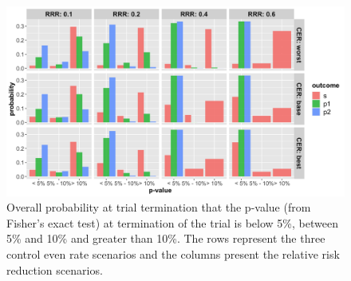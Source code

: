 \documentclass[]{article}
\begin{document}
\begin{figure}
  \caption{Overall probability at trial termination that the p-value (from Fisher’s exact test) at termination of the
  trial is below 5\%, between 5\% and 10\% and greater than 10\%. The rows represent the three control even rate scenarios
  and the columns present the relative risk reduction scenarios.}
  \includegraphics{../p1_plots/batch_size_nb_3000/pvalue_p1.png}
\end{figure}
\end{document}
